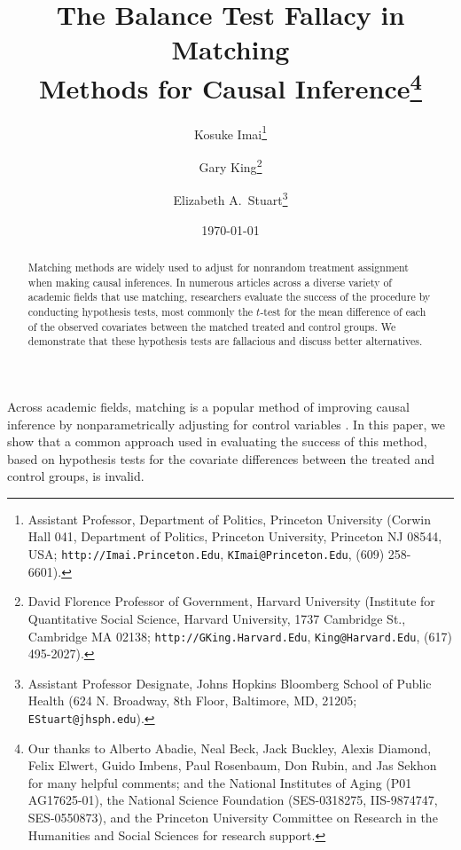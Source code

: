 \documentclass[11pt,titlepage]{article}
\title{The Balance Test Fallacy in Matching\\ Methods for Causal
  Inference\thanks{Our thanks to Alberto Abadie, Neal Beck, Jack
    Buckley, Alexis Diamond, Felix Elwert, Guido Imbens, Paul
    Rosenbaum, Don Rubin, and Jas Sekhon for many helpful comments;
    and the National Institutes of Aging (P01 AG17625-01), the
    National Science Foundation (SES-0318275, IIS-9874747,
    SES-0550873), and the Princeton University Committee on Research
    in the Humanities and Social Sciences for research support.}}
\author{Kosuke Imai\thanks{Assistant Professor, Department of
    Politics, Princeton University (Corwin Hall 041, Department of
    Politics, Princeton University, Princeton NJ 08544, USA;
    \texttt{http://Imai.Princeton.Edu}, \texttt{KImai@Princeton.Edu},
    (609) 258-6601).}  \and Gary King\thanks{David Florence Professor
    of Government, Harvard University (Institute for Quantitative
    Social Science, Harvard University, 1737 Cambridge St., Cambridge
    MA 02138; \texttt{http://GKing.Harvard.Edu},
    \texttt{King@Harvard.Edu}, (617) 495-2027).}  \and Elizabeth A.\ 
  Stuart\thanks{Assistant Professor Designate, Johns Hopkins Bloomberg
    School of Public Health (624 N. Broadway, 8th Floor, Baltimore,
    MD, 21205; \texttt{EStuart@jhsph.edu}).}}
\date{\today}
\begin{document}
\maketitle

\begin{abstract}
  Matching methods are widely used to adjust for nonrandom treatment
  assignment when making causal inferences.  In numerous articles
  across a diverse variety of academic fields that use matching,
  researchers evaluate the success of the procedure by conducting
  hypothesis tests, most commonly the $t$-test for the mean difference
  of each of the observed covariates between the matched treated and
  control groups. We demonstrate that these hypothesis tests are
  fallacious and discuss better alternatives.
\end{abstract}

Across academic fields, matching is a popular method of improving
causal inference by nonparametrically adjusting for control variables
\citep{Imbens04,Rosenbaum02,Rubin06}.  In this paper, we show that a
common approach used in evaluating the success of this method, based
on hypothesis tests for the covariate differences between the treated
and control groups, is invalid.
\end{document}
